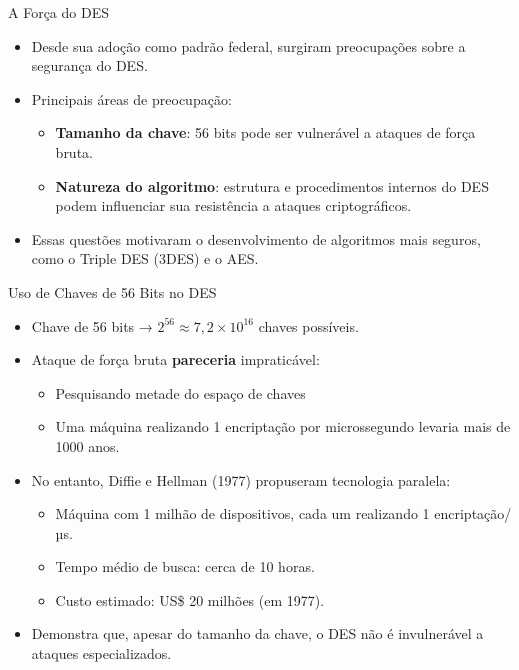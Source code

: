 \begin{frame}{A Força do DES}
    \begin{itemize}
        \item Desde sua adoção como padrão federal, surgiram preocupações sobre a segurança do DES.
        \item Principais áreas de preocupação:
              \begin{itemize}
                  \item \textbf{Tamanho da chave}: 56 bits pode ser vulnerável a ataques de força bruta.
                  \item \textbf{Natureza do algoritmo}: estrutura e procedimentos internos do DES podem influenciar sua resistência a ataques criptográficos.
              \end{itemize}
        \item Essas questões motivaram o desenvolvimento de algoritmos mais seguros, como o Triple DES (3DES) e o AES.
    \end{itemize}
\end{frame}

\begin{frame}{Uso de Chaves de 56 Bits no DES}
    \begin{itemize}
        \item Chave de 56 bits → $2^{56} \approx 7,2 \times 10^{16}$ chaves possíveis.
        \item Ataque de força bruta \textbf{pareceria} impraticável:
              \begin{itemize}
                  \item Pesquisando metade do espaço de chaves
                  \item Uma máquina realizando 1 encriptação por microssegundo levaria mais de 1000 anos.
              \end{itemize}
        \item No entanto, Diffie e Hellman (1977) propuseram tecnologia paralela:
              \begin{itemize}
                  \item Máquina com 1 milhão de dispositivos, cada um realizando 1 encriptação/µs.
                  \item Tempo médio de busca: cerca de 10 horas.
                  \item Custo estimado: US\$ 20 milhões (em 1977).
              \end{itemize}
        \item Demonstra que, apesar do tamanho da chave, o DES não é invulnerável a ataques especializados.
    \end{itemize}
\end{frame}

